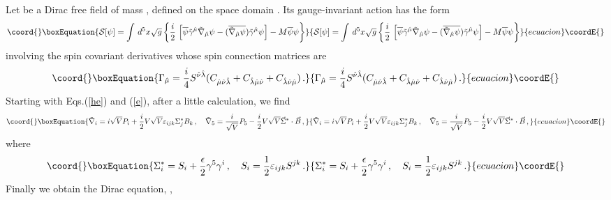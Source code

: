 \documentclass[a4paper,12pt]{article}
\begin{document}
Let \myHighlight{$\psi$}\coordHE{} be a Dirac free field of  mass \coordHE{}, defined on the  space 
domain \coordHE{}. Its gauge-invariant action  \cite{DKK} has the form     
\begin{equation}\coord{}\boxEquation{\label{(action)}
{\cal S}[\psi]=\int\, d^{5}x\sqrt{g}\left\{
\frac{i}{2}\,\left[\overline{\psi}\tilde\gamma^{\hat\mu}
\tilde\nabla_{\hat\mu}\psi-
(\overline{\tilde\nabla_{\hat\mu}\psi})\tilde\gamma^{\hat\mu}\psi
\right] - 
 M\overline{\psi}\psi\right\}
}{{\cal S}[\psi]=\int\, d^{5}x\sqrt{g}\left\{
\frac{i}{2}\,\left[\overline{\psi}\tilde\gamma^{\hat\mu}
\tilde\nabla_{\hat\mu}\psi-
(\overline{\tilde\nabla_{\hat\mu}\psi})\tilde\gamma^{\hat\mu}\psi
\right] - 
 M\overline{\psi}\psi\right\}
}{ecuacion}\coordE{}\end{equation}
involving the spin covariant derivatives 
\myHighlight{$\tilde\nabla_{\hat\mu}=\hat\partial_{\hat\mu}+\Gamma_{\hat\mu}$}\coordHE{} whose  
spin connection matrices are 
\begin{equation}\coord{}\boxEquation{\label{con}
\Gamma_{\hat\mu}
=\frac{i}{4}S^{\hat\nu \hat\lambda}(C_{\hat\mu \hat\nu \hat\lambda}+
C_{\hat\lambda \hat\mu \hat\nu}+C_{\hat\lambda \hat\nu \hat\mu})\,.
}{\Gamma_{\hat\mu}
=\frac{i}{4}S^{\hat\nu \hat\lambda}(C_{\hat\mu \hat\nu \hat\lambda}+
C_{\hat\lambda \hat\mu \hat\nu}+C_{\hat\lambda \hat\nu \hat\mu})\,.
}{ecuacion}\coordE{}\end{equation}
Starting with  Eqs.(\ref{he}) and  (\ref{e}), after a little calculation,
we find  
\begin{equation}\coord{}\boxEquation{\label{sder}
\tilde \nabla_{i}=i\sqrt{V}P_{i}+\frac{i}{2}V\sqrt{V}\varepsilon_{ijk}
\Sigma_{j}^{*}B_{k}\,,\quad
\tilde \nabla_{5}=\frac{i}{\sqrt{V}}P_{5}-\frac{i}{2}V\sqrt{V}
\vec{\Sigma}^{*}\cdot\vec{B}\,,
}{\tilde \nabla_{i}=i\sqrt{V}P_{i}+\frac{i}{2}V\sqrt{V}\varepsilon_{ijk}
\Sigma_{j}^{*}B_{k}\,,\quad
\tilde \nabla_{5}=\frac{i}{\sqrt{V}}P_{5}-\frac{i}{2}V\sqrt{V}
\vec{\Sigma}^{*}\cdot\vec{B}\,,
}{ecuacion}\coordE{}\end{equation}
where
\begin{equation}\coord{}\boxEquation{
\Sigma_{i}^{*}=S_{i}+\frac{\epsilon}{2}\gamma^{5}\gamma^{i}\,,\quad
S_{i}=\frac{1}{2}\varepsilon_{ijk}S^{jk}\,. 
}{
\Sigma_{i}^{*}=S_{i}+\frac{\epsilon}{2}\gamma^{5}\gamma^{i}\,,\quad
S_{i}=\frac{1}{2}\varepsilon_{ijk}S^{jk}\,. 
}{ecuacion}\coordE{}\end{equation}
Finally we obtain the Dirac equation, \coordHE{}, 
\end{document}
